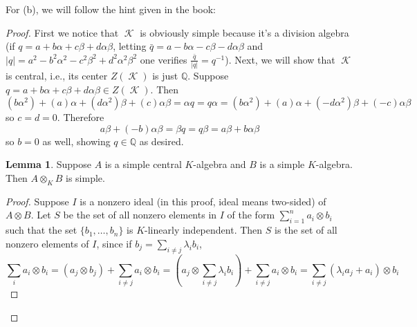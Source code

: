\documentclass{article}
\theoremstyle{customplain}
\theoremstyle{customdef}
\newcommand{\Q}{\mathbb{Q}}
\DeclareMathOperator{\calK}{\mathcal{K}}
\theoremstyle{definition} %
\newtheorem*{lemma*}{Lemma}
\begin{document}
For (b), we will follow the hint given in the book:\begin{proof}
    First we notice that $\calK$ is obviously simple because it's a division algebra (if $q=a+b\alpha+c\beta+d\alpha\beta$, letting $\bar q = a-b\alpha-c\beta-d\alpha\beta$ and $|q|=a^2-b^2\alpha^2-c^2\beta^2+d^2\alpha^2\beta^2$ one verifies $\frac{\bar q}{|q|}=q^{-1}$). Next, we will show that $\calK$ is central, i.e., its center $Z(\calK)$ is just $\Q.$ Suppose $q=a+b\alpha+c\beta+d\alpha \beta \in Z(\calK).$ Then
    \[
    (b\alpha^2)+(a)\alpha+(d\alpha^2) \beta+(c) \alpha \beta=\alpha q =q \alpha = (b\alpha^2)+(a)\alpha+(-d \alpha^2)\beta+(-c)\alpha \beta
    \]
    so $c=d=0$. Therefore
    \[
    a\beta+(-b)\alpha \beta=\beta q = q\beta=a\beta+b\alpha \beta
    \]
    so $b=0$ as well, showing $q\in \Q$ as desired.
    \begin{lemma*}
        Suppose $A$ is a simple central $K$-algebra and $B$ is a simple $K$-algebra. Then $A\otimes_K B$ is simple.
    \end{lemma*}
    \begin{proof}
        Suppose $I$ is a nonzero ideal (in this proof, ideal means two-sided) of $A\otimes B.$ Let $S$ be the set of all nonzero elements in $I$ of the form $\sum_{i=1}^n a_i \otimes b_i$ such that the set $\{b_1, \dots, b_n\}$ is $K$-linearly independent. Then $S$ is the set of all nonzero elements of $I$, since if $b_j = \sum_{i \ne j} \lambda_i b_i$, 
        \[
        \sum_i a_i \otimes b_i =(a_j \otimes b_j)+ \sum_{i\ne j} a_i \otimes b_i =(a_j\otimes \sum_{i\ne j} \lambda_i b_i)+\sum_{i\ne j} a_i \otimes b_i=\sum_{i\ne j}(\lambda_i a_j+a_i)\otimes b_i
        \]
        

\end{proof}
\end{proof}
\end{document}
